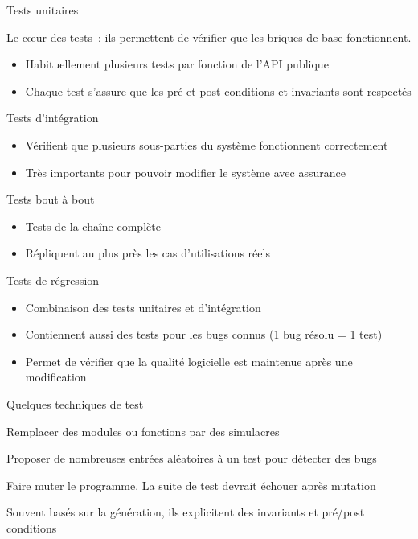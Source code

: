\begin{frame}{Tests unitaires}

  Le cœur des tests~: ils permettent de vérifier que les briques de base fonctionnent.

  \begin{itemize}[<+->]
    \item Habituellement plusieurs tests par fonction \alert{de l'API publique}
    \item Chaque test s'assure que les pré et post conditions et invariants sont respectés
  \end{itemize}
\end{frame}

\begin{frame}{Tests d'intégration}

  \begin{itemize}[<+->]
    \item Vérifient que plusieurs sous-parties du système fonctionnent correctement
    \item Très importants pour pouvoir modifier le système avec assurance
  \end{itemize}
\end{frame}

\begin{frame}{Tests bout à bout}
  \begin{itemize}[<+->]
    \item Tests de la chaîne complète
    \item Répliquent au plus près les cas d'utilisations réels
  \end{itemize}
\end{frame}

\begin{frame}{Tests de régression}
  \begin{itemize}[<+->]
    \item Combinaison des tests unitaires et d'intégration
    \item Contiennent aussi des tests pour les bugs connus (1 bug résolu = 1 test)
    \item Permet de vérifier que la qualité logicielle est maintenue après une modification
  \end{itemize}
\end{frame}

\begin{frame}{Quelques techniques de test}
  \begin{description}[<+->]
    \item[Simulacres] Remplacer des modules ou fonctions par des simulacres
    \item[Génération] Proposer de nombreuses entrées aléatoires à un test pour détecter des bugs
    \item[Mutations] Faire muter le programme. La suite de test devrait échouer après mutation
    \item[Contrats] Souvent basés sur la génération, ils explicitent des invariants et pré/post conditions
  \end{description}
\end{frame}

